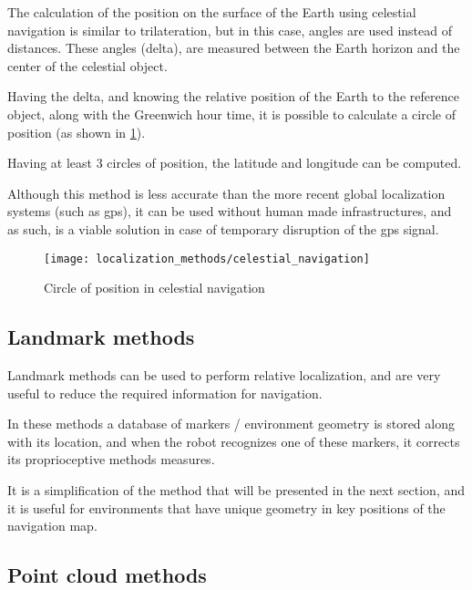 The calculation of the position on the surface of the Earth using celestial navigation is similar to trilateration, but in this case, angles are used instead of distances. These angles (delta), are measured between the Earth horizon and the center of the celestial object.

Having the delta, and knowing the relative position of the Earth to the reference object, along with the Greenwich hour time, it is possible to calculate a circle of position (as shown in \cref{fig:localization-methods_celestial-navigation}).

Having at least 3 circles of position, the latitude and longitude can be computed.

Although this method is less accurate than the more recent global localization systems (such as \gls{gps}), it can be used without human made infrastructures, and as such, is a viable solution in case of temporary disruption of the \gls{gps} signal.

\begin{figure}[h]
	\centering
	\texttt{[image: localization\_methods/celestial\_navigation]}
	\caption{Circle of position in celestial navigation\protect\footnotemark}
	\label{fig:localization-methods_celestial-navigation}
\end{figure}

\subsection{Landmark methods}

Landmark methods \cite{Lee2006} can be used to perform relative localization, and are very useful to reduce the required information for navigation.

In these methods a database of markers / environment geometry is stored along with its location, and when the robot recognizes one of these markers, it corrects its proprioceptive methods measures.

It is a simplification of the method that will be presented in the next section, and it is useful for environments that have unique geometry in key positions of the navigation map.


\subsection{Point cloud methods}

